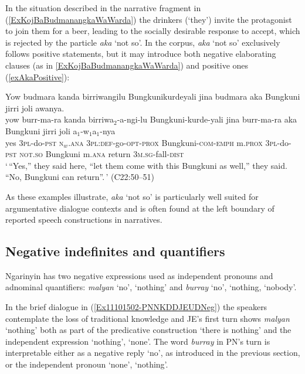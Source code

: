 \documentclass[output=paper,colorlinks,citecolor=brown]{langscibook}
\begin{document}
In the situation described in the narrative fragment in (\ref{ExKojBaBudmanangkaWaWarda}) the drinkers (`they') invite the protagonist to join them for a beer, leading to the socially desirable response to accept, which is rejected by the particle \textit{aka} `not so'. In the corpus, \textit{aka} `not so' exclusively follows positive statements, but it may introduce both negative elaborating clauses (as in \ref{ExKojBaBudmanangkaWaWarda}) and positive ones (\ref{exAkaPositive}):

\begin{exe}
\ex \label{exAkaPositive}
\glll Yow budmara kanda birriwangilu Bungkunikurdeyali jina budmara aka Bungkuni jirri joli awanya.\\
yow burr-ma-ra kanda birriwa$_2$-a-ngi-lu Bungkuni-kurde-yali jina burr-ma-ra aka Bungkuni jirri joli a$_1$-w$_1$a$_1$-nya\\
yes 3\textsc{pl}-do-\textsc{pst} \textsc{n}$_w$.\textsc{ana} 3\textsc{pl}:\textsc{def}-go-\textsc{opt}-\textsc{prox} Bungkuni-\textsc{com}-\textsc{emph} m.\textsc{prox} 3\textsc{pl}-do-\textsc{pst} \textsc{not.so} Bungkuni m.\textsc{ana} return 3\textsc{m.sg}-fall-\textsc{dist}\\
\trans `\,``Yes,'' they said here, ``let them come with this Bungkuni as well,'' they said. ``No, Bungkuni can return''.\,' (C22:50--51)
\end{exe}

As these examples illustrate, \textit{aka} `not so' is particularly well suited for argumentative dialogue contexts and is often found at the left boundary of reported speech constructions in narratives.

\subsection{Negative indefinites and quantifiers} \label{subsNegativeQuantifers}

Ngarinyin has two negative expressions used as independent pronouns and adnominal quantifiers: \textit{malyan} `no', `nothing' and \textit{burray} `no', `nothing, `nobody'.

In the brief dialogue in (\ref{Ex11101502-PNNKDDJEUDNeg}) the speakers contemplate the loss of traditional knowledge and JE's first turn shows \textit{malyan} `nothing' both as part of the predicative construction `there is nothing' and the independent expression `nothing', `none'. The word \textit{burray} in PN's turn is interpretable either as a negative reply `no', as introduced in the previous section, or the independent pronoun `none', `nothing'.
\end{document}
